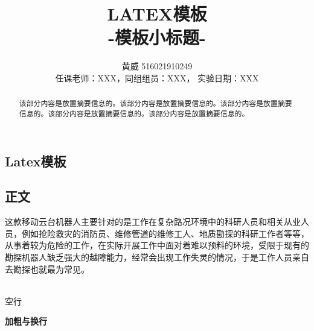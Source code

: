 \documentclass[12pt]{article}
\begin{document}
\begin{CJK}{UTF8}{gbsn}        %
 \pagestyle{fancy}
 \lhead{}                         %
 \chead{}                         %
 \lfoot{}                       
 \rfoot{\thepage} 
 \renewcommand{\headrulewidth}{0.4pt}
 \renewcommand{\footrulewidth}{0.4pt}
\title{\huge LATEX模板 \\ \Large -模板小标题-}  
\author{黄威 516021910249\\  
\small 任课老师：XXX，\small 同组组员：XXX， \small 实验日期：XXX}            
\date{}   %
\maketitle                         %
\begin{abstract}
该部分内容是放置摘要信息的。该部分内容是放置摘要信息的。该部分内容是放置摘要信息的。该部分内容是放置摘要信息的。该部分内容是放置摘要信息的。
\end{abstract}

\renewcommand{\contentsname}{目录} %
\tableofcontents                  %
\newpage


\section{Latex模板}


\subsection{正文}
\label{sec:fastguide}
这款移动云台机器人主要针对的是工作在复杂路况环境中的科研人员和相关从业人员，例如抢险救灾的消防员、维修管道的维修工人、地质勘探的科研工作者等等，从事着较为危险的工作，在实际开展工作中面对着难以预料的环境，受限于现有的勘探机器人缺乏强大的越障能力，经常会出现工作失灵的情况，于是工作人员亲自去勘探也就最为常见。\par
~\\                                      %
空行\par
\textbf{加粗与换行}


\end{CJK}
\end{document}
